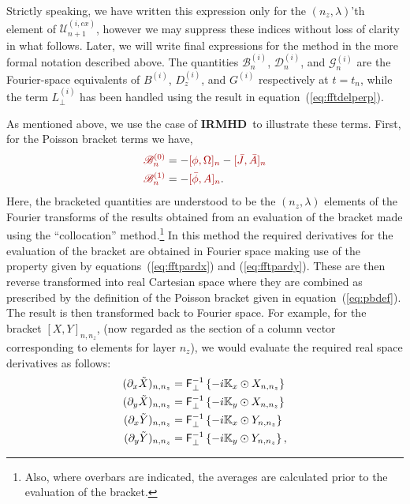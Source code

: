 \documentclass[12pt, letterpaper, oneside, leqno, openright]{memoir}
\newcommand{\irmhd}{\textbf{IRMHD}}
\newcommand{\fftperp}{\mathsf{F}_\perp}
\newcommand{\bfield}{\mathscr{B}}
\newcommand{\dfield}{\mathscr{D}}
\newcommand{\gfield}{\mathscr{G}}
\newcommand{\ufield}{\mathscr{U}}
\begin{document}
%
Strictly speaking, we have written this expression only for the
$(n_z, \lambda)$'th element of $\ufield_{n+1}^{(i,ex)}$, however
we may suppress these indices without loss of clarity in what 
follows. Later, we will write final expressions for the method
in the more formal notation described above.
The quantities 
{\color{red!65!black}$\bfield^{(i)}_{n}$},
{\color{blue!65!black}$\dfield^{(i)}_n$}, 
and 
{\color{green!65!black}$\gfield^{(i)}_n$} 
are the Fourier-space equivalents of
{\color{red!65!black}$B^{(i)}$},
{\color{blue!65!black}$D_z^{(i)}$}, and 
{\color{green!65!black}$G^{(i)}$} 
respectively at $t=t_n$, while the term 
{\color{orange}$L^{(i)}_\perp$} has 
been handled using the result in equation~(\ref{eq:fftdelperp}).
%
\par
%
As mentioned above, we use the case of \irmhd\ to illustrate
these terms. First, for the Poisson bracket terms we have,
%
\begin{subequations}
\begin{align}
  {\color{red!65!black}\bfield^{(0)}_n} &= -{\color{red!65!black}[\phi,\Omega]_n} - {\color{red!65!black}[\bar J,\bar A]_n} \label{eq:bdefa} \\
  {\color{red!65!black}\bfield^{(1)}_n} &= -{\color{red!65!black}[\bar\phi,A]_n}.                                           \label{eq:bdefb}
\end{align}
\end{subequations}
%
Here, the bracketed quantities are understood to be the
$(n_z,\lambda)$ elements of the Fourier transforms of
the results obtained from an evaluation of the bracket
made using the ``collocation'' method.\footnote{Also,
where overbars are indicated, the averages are calculated
prior to the evaluation of the bracket.} In this method
the required derivatives for the evaluation of the
bracket are obtained in Fourier space making use of the
property given by equations~(\ref{eq:fftpardx}) and
(\ref{eq:fftpardy}). These are then reverse transformed
into real Cartesian space where they are combined as
prescribed by the definition of the Poisson bracket given
in equation~(\ref{eq:pbdef}). The result is then transformed
back to Fourier space.  For example, for the bracket
{\color{red!65!black}$[X,Y]_{n,n_z}$}, (now regarded as
the section of a column vector corresponding to elements
for layer $n_z$), we would evaluate the required real
space derivatives as follows:
%
\begin{subequations}
\begin{align}
  (\pardx \tilde X)_{n,n_z} &= \fftperp^{-1}\left\{ -i\mathbb{K}_{x} \odot X_{n,n_z}\right\} \\
  (\pardy \tilde X)_{n,n_z} &= \fftperp^{-1}\left\{ -i\mathbb{K}_{y} \odot X_{n,n_z}\right\} \\
  (\pardx \tilde Y)_{n,n_z} &= \fftperp^{-1}\left\{ -i\mathbb{K}_{x} \odot Y_{n,n_z}\right\} \\
  (\pardy \tilde Y)_{n,n_z} &= \fftperp^{-1}\left\{ -i\mathbb{K}_{y} \odot Y_{n,n_z}\right\},
\end{align}
\end{subequations}
\end{document}
